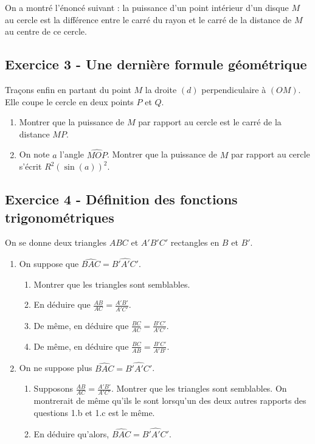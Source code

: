 \documentclass[12 pt]{extarticle}
\theoremstyle{plain}
\begin{document}
On a montré l'énoncé suivant : la puissance d'un point intérieur d'un disque $M$ au cercle est la différence entre le carré du rayon et le carré de la distance de $M$ au centre de ce cercle. 


\subsection*{Exercice 3 - Une dernière formule géométrique}

Traçons enfin en partant du point $M$ la droite $(d)$ perpendiculaire à $(OM)$. Elle coupe le cercle en deux points $P$ et $Q$. 
\begin{enumerate}
\item Montrer que la puissance de $M$ par rapport au cercle est le carré de la distance $MP$. 
\item On note $a$ l'angle $\widehat{MOP}$. Montrer que la puissance de $M$ par rapport au cercle s'écrit $R^2(\sin(a))^2$. 
\end{enumerate}

\subsection*{Exercice 4 - Définition des fonctions trigonométriques}

On se donne deux triangles $ABC$ et $A'B'C'$ rectangles en $B$ et $B'$. 

\begin{enumerate}
\item On suppose que $\widehat{BAC}=\widehat{B'A'C'}$.
\begin{enumerate}
\item Montrer que les triangles sont semblables. 
\item En déduire que $\frac{AB}{AC} = \frac{A'B'}{A'C'}$.
\item De même, en déduire que $\frac{BC}{AC} = \frac{B'C'}{A'C'}$. 
\item De même, en déduire que $\frac{BC}{AB} = \frac{B'C'}{A'B'}$. 
\end{enumerate} 
\item On ne suppose plus $\widehat{BAC}=\widehat{B'A'C'}$. 
\begin{enumerate}
\item Supposons $\frac{AB}{AC} = \frac{A'B'}{A'C'}$. 
Montrer que les triangles sont semblables. On montrerait de même qu'ils le sont lorsqu'un des deux autres rapports des questions 1.b et 1.c est le même.
\item En déduire qu'alors, $\widehat{BAC}=\widehat{B'A'C'}$.
\end{enumerate}
\end{enumerate}
\end{document}
